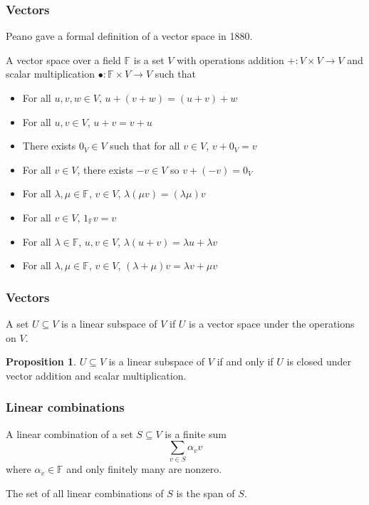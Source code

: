 \documentclass{beamer}
\theoremstyle{definition}
\newtheorem*{proposition*}{Proposition}
\begin{document}
\begin{frame}
    \frametitle{Vectors}
    
    Peano gave a formal definition of a vector space in 1880\cite{hist-alg}.
    \pause
    \begin{definition}
        A vector space over a field $\mathbb{F}$ is a set $V$ with operations addition $+: V \times V \longrightarrow V$ and scalar
        multiplication $\bullet : \mathbb{F} \times V \longrightarrow V$ such that
        \begin{itemize}
            \item For all $u, v, w \in V$, $u + (v + w) = (u + v) + w$
            \item For all $u, v \in V$, $u + v = v + u$
            \item There exists $0_V \in V$ such that for all $v \in V$, $v + 0_V = v$
            \item For all $v \in V$, there exists $-v \in V$ so $v + (-v) = 0_V$
            \item For all $\lambda, \mu \in \mathbb{F}$, $v \in V$, $\lambda(\mu v) = (\lambda \mu)v$
            \item For all $v \in V$, $1_\mathbb{F} v = v$
            \item For all $\lambda \in \mathbb{F}$, $u, v \in V$, $\lambda(u+v) = \lambda u + \lambda v$
            \item For all $\lambda, \mu \in \mathbb{F}$, $v \in V$, $(\lambda + \mu)v = \lambda v + \mu v$
        \end{itemize}
    \end{definition}
\end{frame}

\begin{frame}
    \frametitle{Vectors}

    \begin{definition}
        A set $U \subseteq V$ is a linear subspace of $V$ if $U$ is a vector space under the operations on $V$.
    \end{definition}
    \begin{proposition*}
        $U \subseteq V$ is a linear subspace of $V$ if and only if $U$ is closed under vector addition and scalar multiplication.
    \end{proposition*}
\end{frame}

\begin{frame}
    \frametitle{Linear combinations}
    \begin{definition}
        A linear combination of a set $S \subseteq V$ is a finite sum
        \[
            \sum_{v \in S} \alpha_v v
        \]
        where $\alpha_v \in \mathbb{F}$ and only finitely many are nonzero.

        The set of all linear combinations of $S$ is the span of $S$.
    \end{definition}
\end{frame}
\end{document}
